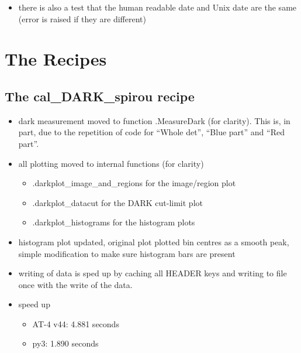 \begin{itemize}
\begin{itemize}
	\item there is also a test that the human readable date and Unix date are the same (error is raised if they are different)

\end{itemize}

\end{itemize}


\section{The Recipes}
\label{ch:changelog:At4:recipes}


\subsection{The cal\_DARK\_spirou recipe}
\label{ch:changelog:At4:cal_DARK_spirou}

\begin{itemize}

\item dark measurement moved to function \spirouImage.MeasureDark (for clarity). This is, in part, due to the repetition of code for ``Whole det'', ``Blue part'' and ``Red part''.

\item all plotting moved to internal functions (for clarity)
	\begin{itemize}
    \item \spirouPlot.darkplot\_image\_and\_regions for the image/region plot
    \item \spirouPlot.darkplot\_datacut for the DARK cut-limit plot
    \item \spirouPlot.darkplot\_histograms for the histogram plots 
    \end{itemize}

\item histogram plot updated, original plot plotted bin centres as a smooth peak, simple modification to make sure histogram bars are present
    
\item writing of data is sped up by caching all HEADER keys and writing to file once with the write of the data.

\item speed up
	\begin{itemize}
	\item AT-4 v44: 4.881 seconds
	\item py3: 1.890 seconds
	\end{itemize}

\end{itemize}

